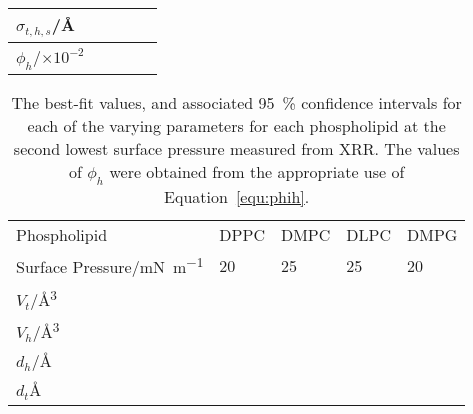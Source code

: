 \begin{table}
\begin{tabular}{l | l l l l}
        $\sigma_{t,h,s}$/\si{\angstrom} &  &  &  &  \\
        \midrule
        $\phi_h$/$\times 10^{-2}$ &  &  &  &  \\
        \bottomrule
    \end{tabular}
\end{table}
%
%
\begin{table}
    \centering
    \small
    \caption{The best-fit values, and associated \SI{95}{\percent} confidence intervals for each of the varying parameters for each phospholipid at the second lowest surface pressure measured from XRR. The values of $\phi_h$ were obtained from the appropriate use of Equation~\protect\ref{equ:phih}.}
    \label{tab:xrrref2}
    \begin{tabular}{l | l l l l}
        \toprule
        Phospholipid & DPPC & DMPC & DLPC & DMPG \\
        Surface Pressure/\si{\milli\newton\per\meter} & 20 & 25 & 25 & 20 \\
        \midrule
        $V_t$/\si{\angstrom\cubed} &  &  &  &  \\
        $V_h$/\si{\angstrom\cubed} &  &  &  &  \\
        $d_h$/\si{\angstrom} &  &  &  &  \\
        \midrule
        $d_t$\si{\angstrom} &  &  &  &  \\

\end{tabular}
\end{table}
